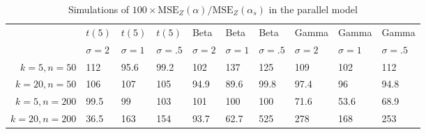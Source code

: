 \begin{table}[ht]
\centering
\caption{Simulations of $100 \times \textrm{MSE}_Z(\alpha)/\textrm{MSE}_Z(\alpha_s)$ in the parallel model} 
\label{tab:simulation}
\begin{tabular}{rlllllllll}
    \toprule
  & $t(5)$ & $t(5)$ & $t(5)$ & Beta & Beta & Beta & Gamma & Gamma & Gamma \\
  \cmidrule(lr){2-4}\cmidrule(lr){5-7}\cmidrule(lr){8-10} 
  & $\sigma = 2$ & $\sigma = 1$ & $\sigma = .5$ & $\sigma = 2$ & $\sigma = 1$ & $\sigma = .5$ & $\sigma = 2$ & $\sigma = 1$ & $\sigma = .5$ \\
$k = 5, n = 50$ & 112 & 95.6 & 99.2 & 102 & 137 & 125 & 109 & 102 & 112 \\ 
  $k = 20, n = 50$ & 106 & 107 & 105 & 94.9 & 89.6 & 99.8 & 97.4 & 96 & 94.8 \\ 
  $k = 5, n = 200$ & 99.5 & 99 & 103 & 101 & 100 & 100 & 71.6 & 53.6 & 68.9 \\ 
  $k = 20, n = 200$ & 36.5 & 163 & 154 & 93.7 & 62.7 & 525 & 278 & 168 & 253 \\ 
    \bottomrule
\end{tabular}
\end{table}
